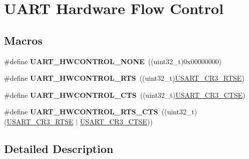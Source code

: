 \hypertarget{group___u_a_r_t___hardware___flow___control}{\section{U\-A\-R\-T Hardware Flow Control}
\label{group___u_a_r_t___hardware___flow___control}
}
\subsection*{Macros}
\begin{DoxyCompactItemize}
\item 
\hypertarget{group___u_a_r_t___hardware___flow___control_gae0569001c06b7760cd38c481f84116cf}{\#define {\bfseries U\-A\-R\-T\-\_\-\-H\-W\-C\-O\-N\-T\-R\-O\-L\-\_\-\-N\-O\-N\-E}~((uint32\-\_\-t)0x00000000)}\label{group___u_a_r_t___hardware___flow___control_gae0569001c06b7760cd38c481f84116cf}

\item 
\hypertarget{group___u_a_r_t___hardware___flow___control_ga6d5dad09c6abf30f252084ba0f8c0b7d}{\#define {\bfseries U\-A\-R\-T\-\_\-\-H\-W\-C\-O\-N\-T\-R\-O\-L\-\_\-\-R\-T\-S}~((uint32\-\_\-t)\hyperlink{group___peripheral___registers___bits___definition_ga7c5d6fcd84a4728cda578a0339b4cac2}{U\-S\-A\-R\-T\-\_\-\-C\-R3\-\_\-\-R\-T\-S\-E})}\label{group___u_a_r_t___hardware___flow___control_ga6d5dad09c6abf30f252084ba0f8c0b7d}

\item 
\hypertarget{group___u_a_r_t___hardware___flow___control_ga352f517245986e3b86bc75f8472c51ea}{\#define {\bfseries U\-A\-R\-T\-\_\-\-H\-W\-C\-O\-N\-T\-R\-O\-L\-\_\-\-C\-T\-S}~((uint32\-\_\-t)\hyperlink{group___peripheral___registers___bits___definition_gaa125f026b1ca2d76eab48b191baed265}{U\-S\-A\-R\-T\-\_\-\-C\-R3\-\_\-\-C\-T\-S\-E})}\label{group___u_a_r_t___hardware___flow___control_ga352f517245986e3b86bc75f8472c51ea}

\item 
\hypertarget{group___u_a_r_t___hardware___flow___control_ga7c91698e8f08ba7ed3f2a0ba9aa27d73}{\#define {\bfseries U\-A\-R\-T\-\_\-\-H\-W\-C\-O\-N\-T\-R\-O\-L\-\_\-\-R\-T\-S\-\_\-\-C\-T\-S}~((uint32\-\_\-t)(\hyperlink{group___peripheral___registers___bits___definition_ga7c5d6fcd84a4728cda578a0339b4cac2}{U\-S\-A\-R\-T\-\_\-\-C\-R3\-\_\-\-R\-T\-S\-E} $\vert$ \hyperlink{group___peripheral___registers___bits___definition_gaa125f026b1ca2d76eab48b191baed265}{U\-S\-A\-R\-T\-\_\-\-C\-R3\-\_\-\-C\-T\-S\-E}))}\label{group___u_a_r_t___hardware___flow___control_ga7c91698e8f08ba7ed3f2a0ba9aa27d73}

\end{DoxyCompactItemize}


\subsection{Detailed Description}
